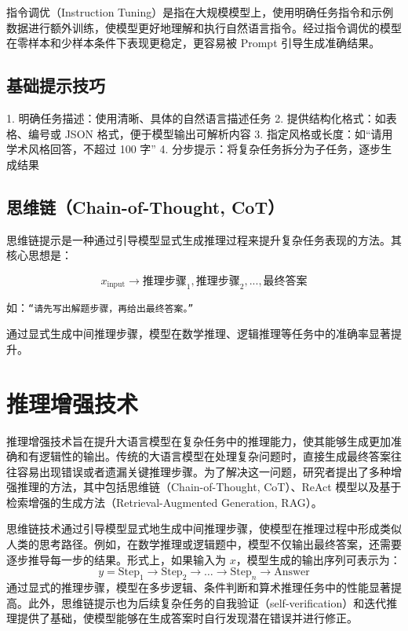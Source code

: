 \documentclass[professional,privacy,print,win,long,STEM,AutoFakeBold]{def/buaa}
\begin{document}
指令调优（Instruction Tuning）是指在大规模模型上，使用明确任务指令和示例数据进行额外训练，使模型更好地理解和执行自然语言指令。经过指令调优的模型在零样本和少样本条件下表现更稳定，更容易被 Prompt 引导生成准确结果。


\subsection{基础提示技巧}

1. 明确任务描述：使用清晰、具体的自然语言描述任务  
2. 提供结构化格式：如表格、编号或 JSON 格式，便于模型输出可解析内容  
3. 指定风格或长度：如“请用学术风格回答，不超过 100 字”  
4. 分步提示：将复杂任务拆分为子任务，逐步生成结果


\subsection{思维链（Chain-of-Thought, CoT）}

思维链提示是一种通过引导模型显式生成推理过程来提升复杂任务表现的方法。其核心思想是：

\begin{equation}
x_\text{input} \longrightarrow \text{推理步骤}_1, \text{推理步骤}_2, ..., \text{最终答案}
\end{equation}

如：\texttt{“请先写出解题步骤，再给出最终答案。”}

通过显式生成中间推理步骤，模型在数学推理、逻辑推理等任务中的准确率显著提升。
\section{推理增强技术}

推理增强技术旨在提升大语言模型在复杂任务中的推理能力，使其能够生成更加准确和有逻辑性的输出。传统的大语言模型在处理复杂问题时，直接生成最终答案往往容易出现错误或者遗漏关键推理步骤。为了解决这一问题，研究者提出了多种增强推理的方法，其中包括思维链（Chain-of-Thought, CoT）、ReAct 模型以及基于检索增强的生成方法（Retrieval-Augmented Generation, RAG）。

思维链技术通过引导模型显式地生成中间推理步骤，使模型在推理过程中形成类似人类的思考路径。例如，在数学推理或逻辑题中，模型不仅输出最终答案，还需要逐步推导每一步的结果。形式上，如果输入为 \(x\)，模型生成的输出序列可表示为：
\begin{equation}
y = \text{Step}_1 \rightarrow \text{Step}_2 \rightarrow \dots \rightarrow \text{Step}_n \rightarrow \text{Answer}
\end{equation}
通过显式的推理步骤，模型在多步逻辑、条件判断和算术推理任务中的性能显著提高。此外，思维链提示也为后续复杂任务的自我验证（self-verification）和迭代推理提供了基础，使模型能够在生成答案时自行发现潜在错误并进行修正。
\end{document}
